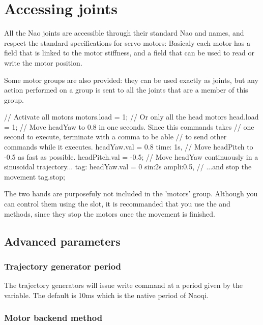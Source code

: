 \section{Accessing joints}
All the Nao joints are accessible through their standard Nao and \urbi names,
and respect the \urbi standard specifications for servo motors: Basicaly each
motor has a  field that is linked to the motor stiffness, and a
 field that can be used to read or write the motor position.

Some motor groups are also provided: they can be used exactly as joints,
but any action performed on a group is sent to all the joints that are a
member of this group.

\begin{urbiunchecked}
// Activate all motors
motors.load = 1;
// Or only all the head motors
head.load = 1;
// Move headYaw to 0.8 in one seconds. Since this commands takes
// one second to execute, terminate with a comma to be able
// to send other commands while it executes.
headYaw.val = 0.8 time: 1s,
// Move headPitch to -0.5 as fast as possible.
headPitch.val = -0.5;
// Move headYaw continuously in a sinusoidal trajectory...
tag: headYaw.val = 0 sin:2s ampli:0.5,
// ...and stop the movement
tag.stop;
\end{urbiunchecked}

The two hands are purposefuly not included in the 'motors' group.
Although you can control them using the  slot, it is recommanded that
you use the  and  methods, since they stop the motors
once the movement is finished.

\subsection{Advanced parameters}

\subsubsection{Trajectory generator period}

The trajectory generators will issue write command at a period given by the
 variable. The default is 10ms which is the native period
of Naoqi.

\subsubsection{Motor backend method}

